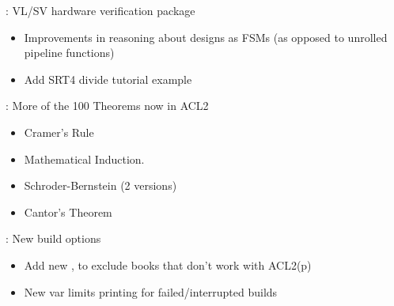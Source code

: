 
\begin{frame}

\implibtitle

:
VL/SV hardware verification package
\begin{itemize}
\item Improvements in reasoning about designs as FSMs (as opposed to unrolled pipeline functions)
\item Add SRT4 divide tutorial example

\end{itemize}

\end{frame}


\begin{frame}

\implibtitle

: More of the 100 Theorems now in ACL2
\begin{itemize}
\item Cramer's Rule
\item Mathematical Induction.
\item Schroder-Bernstein (2 versions)
\item Cantor's Theorem
\end{itemize}

\end{frame}


\begin{frame}

\implibtitle

: New build options
\begin{itemize}
\item Add new  , to exclude books that don't work with ACL2(p)
\item New  var limits printing for failed/interrupted builds
\end{itemize}

\end{frame}


